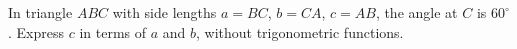 In triangle $ABC$ with side lengths $a=BC$, $b=CA$, $c=AB$, the angle at $C$ is $60^\circ$. Express $c$ in terms of $a$ and $b$, without trigonometric functions.
